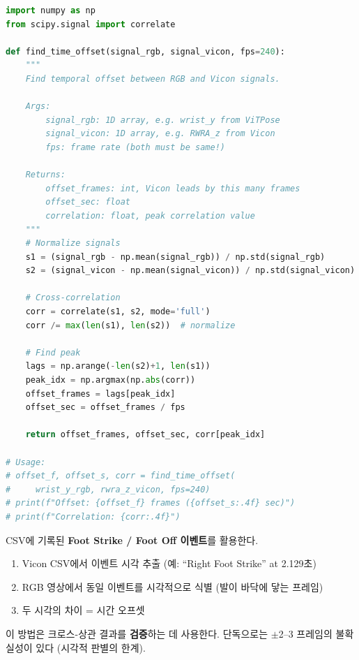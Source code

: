 \documentclass[11pt, a4paper]{report}
\begin{document}
\begin{codebox}[title={크로스-상관 시간 동기화 코드}]
\begin{lstlisting}[language=Python]
import numpy as np
from scipy.signal import correlate

def find_time_offset(signal_rgb, signal_vicon, fps=240):
    """
    Find temporal offset between RGB and Vicon signals.

    Args:
        signal_rgb: 1D array, e.g. wrist_y from ViTPose
        signal_vicon: 1D array, e.g. RWRA_z from Vicon
        fps: frame rate (both must be same!)

    Returns:
        offset_frames: int, Vicon leads by this many frames
        offset_sec: float
        correlation: float, peak correlation value
    """
    # Normalize signals
    s1 = (signal_rgb - np.mean(signal_rgb)) / np.std(signal_rgb)
    s2 = (signal_vicon - np.mean(signal_vicon)) / np.std(signal_vicon)

    # Cross-correlation
    corr = correlate(s1, s2, mode='full')
    corr /= max(len(s1), len(s2))  # normalize

    # Find peak
    lags = np.arange(-len(s2)+1, len(s1))
    peak_idx = np.argmax(np.abs(corr))
    offset_frames = lags[peak_idx]
    offset_sec = offset_frames / fps

    return offset_frames, offset_sec, corr[peak_idx]

# Usage:
# offset_f, offset_s, corr = find_time_offset(
#     wrist_y_rgb, rwra_z_vicon, fps=240)
# print(f"Offset: {offset_f} frames ({offset_s:.4f} sec)")
# print(f"Correlation: {corr:.4f}")
\end{lstlisting}
\end{codebox}

\begin{solutionbox}[title={Strategy 2: 이벤트 기반 동기화 (보조)}]
CSV에 기록된 \textbf{Foot Strike / Foot Off 이벤트}를 활용한다.

\begin{enumerate}[nosep]
  \item Vicon CSV에서 이벤트 시각 추출 (예: ``Right Foot Strike'' at 2.129초)
  \item RGB 영상에서 동일 이벤트를 시각적으로 식별 (발이 바닥에 닿는 프레임)
  \item 두 시각의 차이 = 시간 오프셋
\end{enumerate}

이 방법은 크로스-상관 결과를 \textbf{검증}하는 데 사용한다.
단독으로는 $\pm$2--3 프레임의 불확실성이 있다 (시각적 판별의 한계).
\end{solutionbox}
\end{document}
